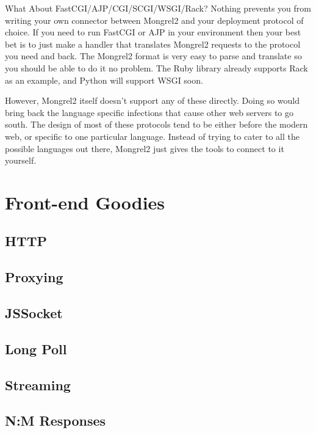 \begin{aside}{What About FastCGI/AJP/CGI/SCGI/WSGI/Rack?}
Nothing prevents you from writing your own connector between Mongrel2 and your 
deployment protocol of choice.  If you need to run FastCGI or AJP in your environment
then your best bet is to just make a handler that translates Mongrel2 requests
to the protocol you need and back.  The Mongrel2 format is very easy to parse and
translate so you should be able to do it no problem.  The Ruby library already supports
Rack as an example, and Python will support WSGI soon.

However, Mongrel2 itself doesn't support any of these directly.  Doing so would bring
back the language specific infections that cause other web servers to go south.  The 
design of most of these protocols tend to be either before the modern web, or specific
to one particular language.  Instead of trying to cater to all the possible languages
out there, Mongrel2 just gives the tools to connect to it yourself.
\end{aside}


\section{Front-end Goodies}


\subsection{HTTP}


\subsection{Proxying}


\subsection{JSSocket}


\subsection{Long Poll}


\subsection{Streaming}


\subsection{N:M Responses}



